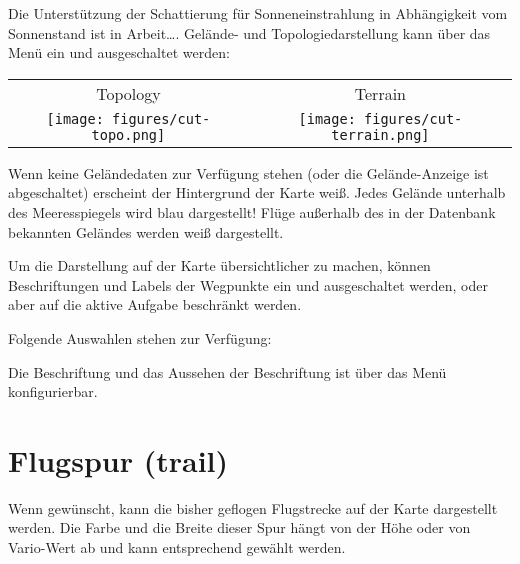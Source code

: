 Die Unterstützung der Schattierung für Sonneneinstrahlung in Abhängigkeit vom Sonnenstand ist in Arbeit\dots.
Gelände- und Topologiedarstellung kann über das Menü ein und ausgeschaltet werden:

\begin{center}
\begin{tabular}{c c}
Topology & Terrain \\
\texttt{[image: figures/cut-topo.png]} &
\texttt{[image: figures/cut-terrain.png]} \\
\end{tabular}
\end{center}

Wenn keine Geländedaten zur Verfügung stehen (oder die Gelände-Anzeige ist abgeschaltet) erscheint der Hintergrund der Karte weiß. Jedes Gelände unterhalb des Meeresspiegels wird blau dargestellt!
Flüge außerhalb des in der Datenbank bekannten Geländes werden weiß dargestellt.

Um die Darstellung auf der Karte übersichtlicher zu machen, können Beschriftungen und Labels der Wegpunkte ein und ausgeschaltet werden, oder aber auf die aktive Aufgabe beschränkt werden.

Folgende Auswahlen stehen zur Verfügung:


Die Beschriftung und das Aussehen der Beschriftung ist über das Menü  konfigurierbar.
\section{Flugspur (trail)}\label{sec:trail}

Wenn gewünscht, kann die bisher geflogen Flugstrecke auf der Karte dargestellt werden. Die Farbe und die Breite dieser Spur hängt von der Höhe oder von Vario-Wert ab und kann entsprechend gewählt werden. 

